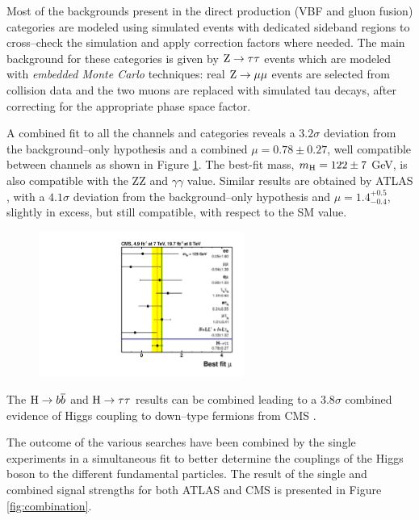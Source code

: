 Most of the backgrounds present in the direct production (VBF and gluon fusion) categories are modeled using simulated events with dedicated sideband regions to cross--check the simulation and apply correction factors where needed. The main background for these categories is given by $\mathrm{Z} \rightarrow \tau\tau$ events which are modeled with \emph{embedded Monte Carlo} techniques: real $\mathrm{Z} \rightarrow \mu \mu$ events are selected from collision data and the two muons are replaced with simulated tau decays, after correcting for the appropriate phase space factor.

A combined fit to all the channels and categories reveals a $3.2\sigma$ deviation from the background--only hypothesis and a combined $\mu = 0.78 \pm 0.27$, well compatible between channels as shown in Figure \ref{fig:htt_mu}. The best-fit mass, $m_{\mathrm{H}} = 122 \pm 7$ GeV, is also compatible with the ZZ and $\gamma\gamma$ value. Similar results are obtained by ATLAS \cite{ATLASCONF:2013108}, with a $4.1\sigma$ deviation from the background--only hypothesis and $\mu = 1.4^{+0.5}_{-0.4}$, slightly in excess, but still compatible, with respect to the SM value.

\begin{figure}
        \centering
	\includegraphics[width=0.6\textwidth]{1_Introduction_Th_and_Exp/pics/BestFit_sm_per_chn.pdf}
       \caption{ }
       \label{fig:htt_mu}
\end{figure}

The $\mathrm{H} \rightarrow b\overline{b}$ and $\mathrm{H} \rightarrow \tau \tau$ results can be combined leading to a $3.8\sigma$ combined evidence of Higgs coupling to down--type fermions from CMS \cite{Chatrchyan:2014vua}.

The outcome of the various searches have been combined by the single experiments in a simultaneous fit to better determine the couplings of the Higgs boson to the different fundamental particles. The result of the single and combined signal strengths for both ATLAS \cite{ATLASCONF:2014009} and CMS \cite{CMS:2014ega} is presented in Figure \ref{fig:combination}.

